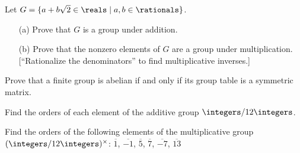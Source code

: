 
\begin{exercise}
	Let $G = \{ a + b\sqrt{2} \in \reals \mid a,b \in \rationals 
	\}$.
	\begin{enumerate}
		\item[(a)] Prove that $G$ is a group under addition.
		
		\item[(b)] Prove that the nonzero elements of $G$ are a 
		group under multiplication. [``Rationalize the 
		denominators'' to find multiplicative inverses.]
	\end{enumerate}
\end{exercise}


\begin{exercise}
	Prove that a finite group is abelian if and only if its group 
	table is a symmetric matrix.
\end{exercise}


\begin{exercise}
	Find the orders of each element of the additive group 
	$\integers/12\integers$.
\end{exercise}


\begin{exercise}
	Find the orders of the following elements of the multiplicative 
	group $(\integers/12\integers)^\times$: $\overline{1}$, 
	$\overline{-1}$, $\overline{5}$, $\overline{7}$, 
	$\overline{-7}$, $\overline{13}$
\end{exercise}































